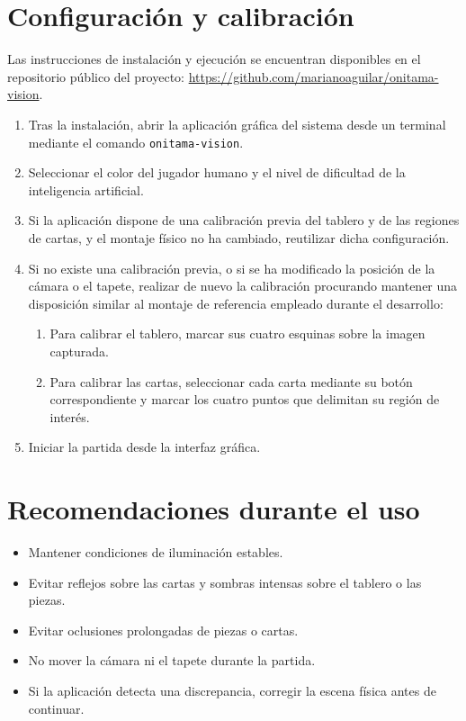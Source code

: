 \section{Configuración y calibración}

Las instrucciones de instalación y ejecución se encuentran disponibles en el repositorio público del proyecto: \url{https://github.com/marianoaguilar/onitama-vision}.

\begin{enumerate}
    \item Tras la instalación, abrir la aplicación gráfica del sistema desde un terminal mediante el comando \texttt{onitama-vision}.

    \item Seleccionar el color del jugador humano y el nivel de dificultad de la inteligencia artificial.

    \item Si la aplicación dispone de una calibración previa del tablero y de las regiones de cartas, y el montaje físico no ha cambiado, reutilizar dicha configuración.

    \item Si no existe una calibración previa, o si se ha modificado la posición de la cámara o el tapete, realizar de nuevo la calibración procurando mantener una disposición similar al montaje de referencia empleado durante el desarrollo:
    \begin{enumerate}[label=\alph*)]
        \item Para calibrar el tablero, marcar sus cuatro esquinas sobre la imagen capturada.

        \item Para calibrar las cartas, seleccionar cada carta mediante su botón correspondiente y marcar los cuatro puntos que delimitan su región de interés.
    \end{enumerate}

    \item Iniciar la partida desde la interfaz gráfica.
\end{enumerate}

\section{Recomendaciones durante el uso}

\begin{itemize}
    \item Mantener condiciones de iluminación estables.

    \item Evitar reflejos sobre las cartas y sombras intensas sobre el tablero o las piezas.

    \item Evitar oclusiones prolongadas de piezas o cartas.

    \item No mover la cámara ni el tapete durante la partida.

    \item Si la aplicación detecta una discrepancia, corregir la escena física antes de continuar.
\end{itemize}